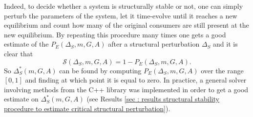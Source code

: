 \documentclass[12pt, titlepage]{report}
\begin{document}
Indeed, to decide whether a system is structurally stable or not, one can simply perturb the parameters of the system, let it time-evolve until it reaches a new equilibrium and count how many of the original consumers are still present at the new equilibrium. By repeating this procedure many times one gets a good estimate of the  $P_E(\Delta_S, m, G, A)$
after a structural perturbation $\Delta_S$ and it is clear that
\begin{equation}
\mathcal{S}(\Delta_S, m, G, A)=1-P_E(\Delta_S, m, G, A).
\end{equation}
So $\Delta_S^*(m, G, A)$ can be found by computing $P_E(\Delta_S, m, G, A)$ over the range $[0,1]$ and finding at which point it is equal to zero. In practice, a general solver involving methods from the C++  library was implemented in order to get a good estimate on $\Delta_S^*(m, G, A)$ (see Results \ref{sec : results structural stability procedure to estimate critical structural perturbation}).

\end{document}
